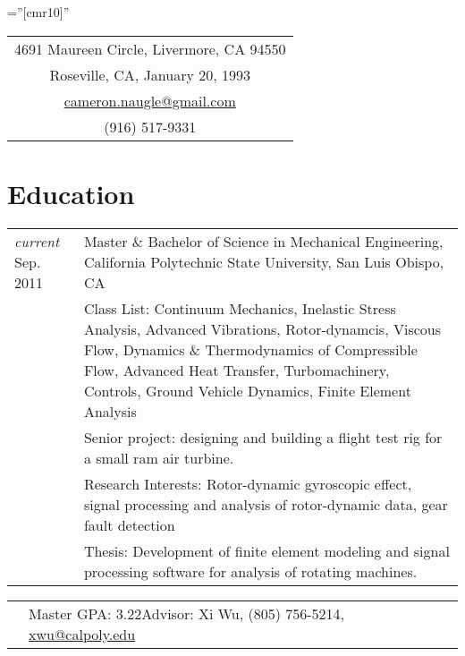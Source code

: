 \documentclass[10pt]{article} %
\newcommand{\secspace}{.25em}
\begin{document}
\thispagestyle{empty} %

\font\fb=''[cmr10]'' %
\setlength{\linewidth}{6.5in}
\setlength{\hsize}{6.5in}

\par{\par} %


\begin{center}
	\begin{tabular} {c}
		
		4691 Maureen Circle, Livermore, CA 94550 \\
		Roseville, CA, January 20, 1993 \\
		\href{mailto:cameron.naugle@gmail.com}{cameron.naugle@gmail.com}\\
		(916) 517-9331\\[\secspace]
	\end{tabular}
\end{center}


\section{Education}

\begin{tabular}{p{.6in}|p{5.5in}}	
	\emph{current} Sep. 2011 & Master \& Bachelor of Science in Mechanical Engineering,  California Polytechnic State University, San Luis Obispo, CA\\
	& \footnotesize{Class List: Continuum Mechanics, Inelastic Stress Analysis, Advanced Vibrations, Rotor-dynamcis, Viscous Flow, Dynamics \& Thermodynamics of Compressible Flow, Advanced Heat Transfer, Turbomachinery, Controls, Ground Vehicle Dynamics, Finite Element Analysis}\\
	& \footnotesize{Senior project: designing and building a flight test rig for a small ram air turbine.}\\
	& \footnotesize{Research Interests: Rotor-dynamic gyroscopic effect, signal processing and analysis of rotor-dynamic data, gear fault detection}\\
	& \footnotesize{Thesis: Development of finite element modeling and signal processing software for analysis of rotating machines.}\\
\end{tabular}\par \vspace{-.5em}
\begin{tabular}{p{.6in}p{5.5in}}	
	&\footnotesize{Master GPA: 3.22\hfill  Advisor: Xi Wu, (805) 756-5214}, \href{mailto:xwu@calpoly.edu}{xwu@calpoly.edu}\\[\secspace]
\end{tabular}
\end{document}
